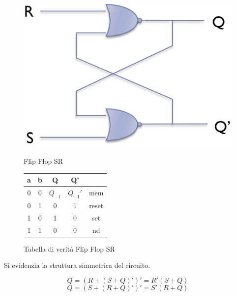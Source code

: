 \begin{figure}[htbp]
    \begin{minipage}[htbp]{0.5\textwidth}
    \centering
        \includegraphics[width=0.8\linewidth]{img/NORRRR.png}
        \caption{Flip Flop SR}
    \end{minipage}
    \begin{minipage}[htbp]{0.5\textwidth}
    \centering

    \begin{tabular}{cc|ccc}
        a & b & Q & Q' & \\
         \hline
        0 & 0 & $Q_{-1}$ & $Q_{-1}'$ & mem\\
        0 & 1 & 0 & 1  & reset\\
        1 & 0 &  1 & 0  & set\\
        1 &  1&  0 & 0   & nd\\
    \end{tabular}
    \caption{Tabella di verità Flip Flop SR}
    
    \end{minipage}
\end{figure}



Si evidenzia la struttura simmetrica del circuito.

\begin{equation*}
    Q = (R+ (S+Q)')' = R'(S+Q)
\end{equation*}
\begin{equation*}
    Q = (S+ (R+Q)')' = S'(R+Q)
\end{equation*}



